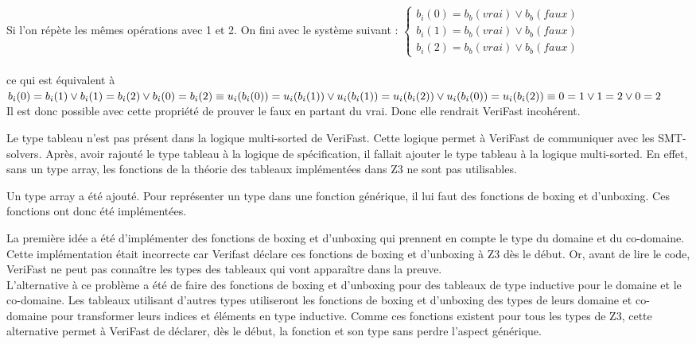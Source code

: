 \documentclass[11pt,openany]{article}
\newcommand{\verifast}{VeriFast}
\begin{document}
		
		Si l'on r\'ep\`ete les m\^emes op\'erations avec 1 et 2. On fini avec le syst\`eme suivant :
$\begin{cases} b_i(0) = b_b(vrai)\lor b_b(faux) \\ b_i(1) = b_b(vrai)\lor b_b(faux) \\ b_i(2) = b_b(vrai)\lor b_b(faux) \end{cases} $
\\ \\
ce qui est \'equivalent \`a \\ 
$b_i(0) = b_i(1)\lor  b_i(1) = b_i(2) \lor b_i(0) = b_i(2)\equiv\\ u_i(b_i(0)) = u_i(b_i(1)) \lor u_i(b_i(1)) = u_i(b_i(2)) \lor u_i(b_i(0)) = u_i(b_i(2))\equiv \\0=1 \lor 1=2 \lor 0=2
$\\
Il est donc possible avec cette propri\'et\'e de prouver le faux en partant du vrai. Donc elle rendrait \verifast{} incoh\'erent. 


			Le type tableau n'est pas pr\'esent dans la logique multi-sorted de \verifast. Cette logique permet \`a \verifast{} de communiquer avec les SMT-solvers. Apr\`es, avoir rajout\'e le type tableau \`a la logique de sp\'ecification, il fallait ajouter le type tableau \`a la logique multi-sorted. En effet, sans un type array, les fonctions de la th\'eorie des tableaux impl\'ement\'ees dans Z3 ne sont pas utilisables.
			
			Un type array a \'et\'e ajout\'e. Pour repr\'esenter un type dans une fonction g\'en\'erique, il lui faut des fonctions de boxing et d'unboxing. Ces fonctions ont donc \'et\'e impl\'ement\'ees.
			
			La premi\`ere id\'ee a \'et\'e d'impl\'ementer des fonctions de boxing et d'unboxing qui prennent en compte le type du domaine et du co-domaine. Cette impl\'ementation \'etait incorrecte car Verifast d\'eclare ces fonctions de boxing et d'unboxing \`a Z3 d\`es le d\'ebut. Or, avant de lire le code, \verifast{} ne peut pas conna\^itre les types des tableaux qui vont appara\^itre dans la preuve.\\
			L'alternative \`a ce probl\`eme a \'et\'e de faire des fonctions de boxing et d'unboxing pour des tableaux de type inductive pour le domaine et le co-domaine. Les tableaux utilisant d'autres types utiliseront les fonctions de boxing et d'unboxing des types de leurs domaine et co-domaine pour transformer leurs indices et \'el\'ements en type inductive. Comme ces fonctions existent pour tous les types de Z3, cette alternative permet \`a \verifast{} de d\'eclarer, d\`es le d\'ebut, la fonction et son type sans perdre l'aspect g\'en\'erique.
			
\end{document}
